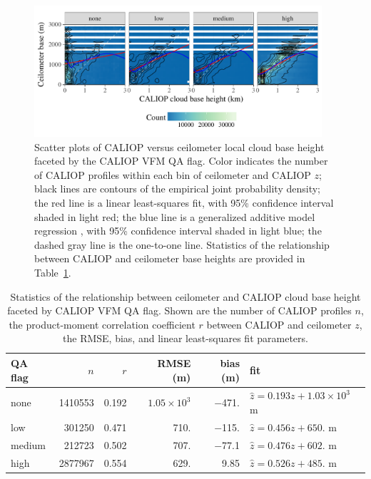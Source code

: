 \documentclass[essd,manuscript]{copernicus}\usepackage[]{graphicx}\usepackage[]{color}
\newenvironment{knitrout}{}{} %
\newcommand\CBH{\ensuremath{z}}
\begin{document}
\begin{figure}
  \centering
\begin{knitrout}
\color{fgcolor}

{\centering \includegraphics[width=0.95\textwidth]{figure/method-eval-qual-1} 

}



\end{knitrout}
  \caption{Scatter plots of CALIOP versus ceilometer local cloud base height
    faceted by the CALIOP VFM QA flag.  Color indicates the number of CALIOP
    profiles within each bin of ceilometer and CALIOP \CBH{}; black
    lines are contours of the empirical joint probability density; the red line
    is a linear least-squares fit, with 95\% confidence interval shaded in light
    red; the blue line is a generalized additive model regression
    \citep{Wood2011}, with 95\% confidence interval shaded in light
    blue; the dashed gray line is the one-to-one line.  Statistics of the
    relationship between CALIOP and ceilometer base heights are provided in
    Table~\ref{tab:quality-qa}.}
  \label{fig:quality-qa}
\end{figure}

\begin{table}
  \centering
  \caption{Statistics of the relationship between ceilometer and CALIOP cloud
    base height faceted by CALIOP VFM QA flag.  Shown are the number of CALIOP
    profiles $n$, the product-moment correlation coefficient $r$ between CALIOP
    and ceilometer \CBH{}, the RMSE, bias, and linear least-squares
    fit parameters.}
  \label{tab:quality-qa}
\begin{tabular}{lrrrrl}
  \hline
\hline
QA flag & $n$ & $r$ & RMSE (m) & bias (m) & fit \\ 
  \hline
none & 1410553 & 0.192 & $1.05 \times 10^{3}$ & $-$471. & $\hat{z} = 0.193 z + \ensuremath{1.03 \times 10^{3}}$ m \\ 
  low & 301250 & 0.471 & 710. & $-$115. & $\hat{z} = 0.456 z + 650.$ m \\ 
  medium & 212723 & 0.502 & 707. & $-$77.1 & $\hat{z} = 0.476 z + 602.$ m \\ 
  high & 2877967 & 0.554 & 629. & 9.85 & $\hat{z} = 0.526 z + 485.$ m \\ 
   \hline
\hline
\end{tabular}

\end{table}
\end{document}
